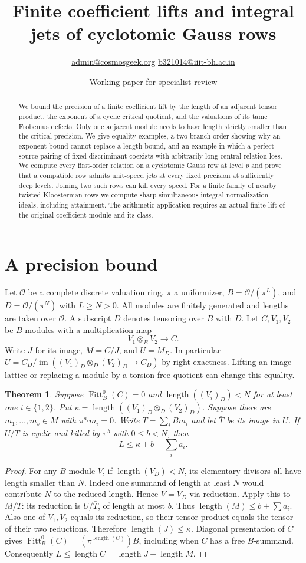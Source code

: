 \documentclass[11pt]{article}
\title{Finite coefficient lifts and integral jets of cyclotomic Gauss rows}
\author{\small\href{mailto:admin@cosmosgeek.org}{admin@cosmosgeek.org}\qquad
\href{mailto:b321014@iiit-bh.ac.in}{b321014@iiit-bh.ac.in}}
\date{Working paper for specialist review}
\newtheorem{theorem}{Theorem}
\newcommand{\len}{\operatorname{length}}
\newcommand{\Fitt}{\operatorname{Fitt}}
\newcommand{\im}{\operatorname{im}}
\newcommand{\OO}{\mathcal O}
\begin{document}
\maketitle
\begin{abstract}
We bound the precision of a finite coefficient lift by the length of
an adjacent tensor product, the exponent of a cyclic critical quotient,
and the valuations of its tame Frobenius defects. Only one adjacent
module needs to have length strictly smaller than the critical precision.
We give equality examples, a two-branch order showing why an exponent
bound cannot replace a length bound, and an example in which a perfect
source pairing of fixed discriminant coexists with arbitrarily long
central relation loss. We compute every first-order relation on a cyclotomic Gauss row at level $p$ and prove that a compatible row admits unit-speed jets at every fixed precision at sufficiently deep levels. Joining two such rows can kill every speed. For a finite family of nearby twisted Kloosterman rows we compute sharp simultaneous integral normalization ideals, including attainment. The arithmetic application requires an actual
finite lift of the original coefficient module and its class.
\end{abstract}

\section{A precision bound}
Let $\OO$ be a complete discrete valuation ring, $\pi$ a uniformizer,
$B=\OO/(\pi^L)$, and $D=\OO/(\pi^N)$ with $L\ge N>0$. All modules
are finitely generated and lengths are taken over $\OO$. A subscript
$D$ denotes tensoring over $B$ with $D$.
Let $C,V_1,V_2$ be $B$-modules with a multiplication map
\[
 V_1\otimes_B V_2\longrightarrow C.
\]
Write $J$ for its image, $M=C/J$, and $U=M_D$.
In particular $U=C_D/\im((V_1)_D\otimes_D(V_2)_D\to C_D)$
by right exactness. Lifting an image lattice or replacing a module
by a torsion-free quotient can change this equality.

\begin{theorem}\label{thm:precision}
Suppose $\Fitt_B^0(C)=0$ and $\len((V_i)_D)<N$ for at least one
$i\in\{1,2\}$. Put
$\kappa=\len((V_1)_D\otimes_D(V_2)_D)$.
Suppose there are $m_1,\ldots,m_s\in M$ with
$\pi^{a_i}m_i=0$. Write $T=\sum_i Bm_i$ and let $\bar T$ be
its image in $U$. If $U/\bar T$ is cyclic and killed by $\pi^b$
with $0\le b<N$, then
\[
 L\le\kappa+b+\sum_i a_i.
\]
\end{theorem}
\begin{proof}
For any $B$-module $V$, if $\len(V_D)<N$, its elementary divisors
all have length smaller than $N$. Indeed one summand of length at
least $N$ would contribute $N$ to the reduced length. Hence $V=V_D$
via reduction. Apply this to $M/T$: its reduction is $U/\bar T$,
of length at most $b$. Thus $\len(M)\le b+\sum a_i$. Also one
of $V_1,V_2$ equals its reduction, so their tensor product equals
the tensor of their two reductions. Therefore $\len(J)\le\kappa$.
Diagonal presentation of $C$ gives
$\Fitt_B^0(C)=(\pi^{\len(C)})B$, including when $C$ has a free
$B$-summand. Consequently $L\le\len C=\len J+\len M$.
\end{proof}
\end{document}
